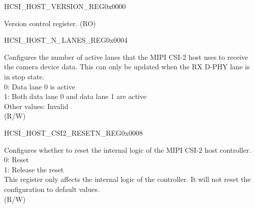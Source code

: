 \begin{register}{H}{CSI\_HOST\_VERSION\_REG}{0x0000}\label{regdesc:CSIHOSTVERSIONREG}
%
\regnewline%
\begin{regdesc}\begin{reglist}
\label{fielddesc:CSIHOSTVERSION}\item [CSI\_HOST\_VERSION] Version control register. (RO)
\end{reglist}\end{regdesc}
\end{register}


\begin{register}{H}{CSI\_HOST\_N\_LANES\_REG}{0x0004}\label{regdesc:CSIHOSTNLANESREG}
%
%
\regnewline%
\begin{regdesc}\begin{reglist}
\label{fielddesc:CSIHOSTNLANES}\item [CSI\_HOST\_N\_LANES] Configures the number of active lanes that the MIPI CSI-2 host uses to receive the camera device data. This can only be updated when the RX D-PHY lane is in stop state. \\
0: Data lane 0 is active \\
1: Both data lane 0 and data lane 1 are active \\
Other values: Invalid \\
(R/W)
\end{reglist}\end{regdesc}
\end{register}


\begin{register}{H}{CSI\_HOST\_CSI2\_RESETN\_REG}{0x0008}\label{regdesc:CSIHOSTCSI2RESETNREG}
%
%
\regnewline%
\begin{regdesc}\begin{reglist}
\label{fielddesc:CSIHOSTCSI2RESETN}\item [CSI\_HOST\_CSI2\_RESETN] Configures whether to reset the internal logic of the MIPI CSI-2 host controller. \\
0: Reset \\
1: Release the reset\\
This register only affects the internal logic of the controller. It will not reset the configuration to default values. \\
(R/W)
\end{reglist}\end{regdesc}
\end{register}


